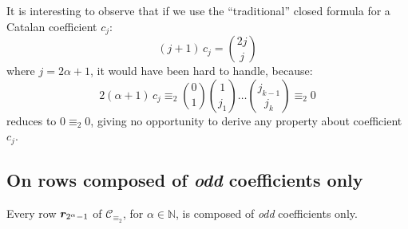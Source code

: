 It is interesting to observe that if we use the ``traditional'' closed formula
for a Catalan coefficient $c_{j}$:
\begin{displaymath}
    (j+1)\,c_{j} = {{2j}\choose{j}} 
\end{displaymath}
where $j=2\alpha+1$, it would have been hard to handle, because:
\begin{displaymath}
    2(\alpha+1)\,c_{j}\equiv_{2} {{0}\choose{1}}{{1}\choose{j_{1}}}
            \ldots{{j_{k-1}}\choose{j_{k}}} \equiv_{2} 0
\end{displaymath}
reduces to $0\equiv_{2}0$, giving no opportunity to derive any
property about coefficient $c_{j}$.



\subsection{On rows composed of \emph{odd} coefficients only}

\begin{theorem}
    Every row $\boldsymbol{r}_{2^{\alpha}-1}$ of $\mathcal{C}_{\equiv_{2}}$, 
    for $\alpha\in\mathbb{N}$, is composed of \emph{odd} coefficients only.
\end{theorem}

